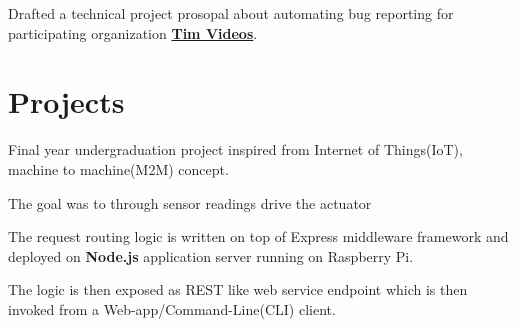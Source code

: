 \documentclass[]{deedy-resume-openfont}
\begin{document}
\begin{minipage}[t]{0.66\textwidth}
\begin{tightemize}
\item Drafted a technical project prosopal about automating bug reporting
  for participating organization \href{http://code.timvideos.us/home/}{\textbf{Tim Videos}}.
\end{tightemize}
\sectionsep


\section{Projects}
\descript{}
\begin{tightemize}
\item Final year undergraduation project inspired from Internet of Things(IoT), machine to machine(M2M)
  concept.
\item The goal was to through sensor readings drive the actuator 
\item The request routing logic is written on top of Express middleware
  framework and deployed on \textbf{Node.js }application server running on
  Raspberry Pi.
\item The logic is then exposed as REST like web service endpoint which is then
  invoked from a Web-app/Command-Line(CLI) client.
\end{tightemize}
\sectionsep


\end{minipage}
\end{document}
